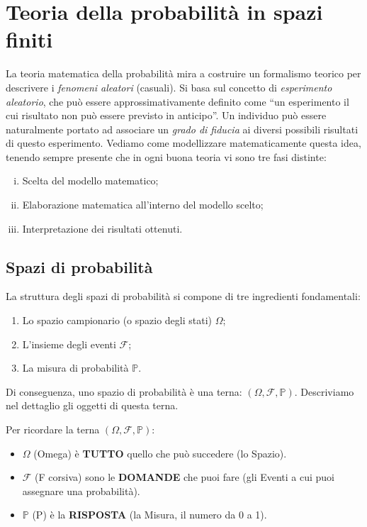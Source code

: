 \documentclass[11pt, a4paper]{report}
\theoremstyle{plain}
\theoremstyle{definition}
\theoremstyle{remark}
\newcommand{\PP}{\mathbb{P}}
\newcommand{\F}{\mathcal{F}}
\newcommand{\1}{\mathbf{1}}
\begin{document}
\newpage

\chapter{Teoria della probabilità in spazi finiti}

La teoria matematica della probabilità mira a costruire un formalismo teorico per descrivere i \emph{fenomeni aleatori} (casuali). Si basa sul concetto di \emph{esperimento aleatorio}, che può essere approssimativamente definito come ``un esperimento il cui risultato non può essere previsto in anticipo''. Un individuo può essere naturalmente portato ad associare un \emph{grado di fiducia} ai diversi possibili risultati di questo esperimento. Vediamo come modellizzare matematicamente questa idea, tenendo sempre presente che in ogni buona teoria vi sono tre fasi distinte:
\begin{enumerate}[(i)]
    \item Scelta del modello matematico;
    \item Elaborazione matematica all'interno del modello scelto;
    \item Interpretazione dei risultati ottenuti.
\end{enumerate}

\section{Spazi di probabilità}

La struttura degli spazi di probabilità si compone di tre ingredienti fondamentali:
\begin{enumerate}
    \item Lo spazio campionario (o spazio degli stati) $\Omega$;
    \item L'insieme degli eventi $\F$;
    \item La misura di probabilità $\PP$.
\end{enumerate}
Di conseguenza, uno spazio di probabilità è una terna: $(\Omega, \F, \PP)$. Descriviamo nel dettaglio gli oggetti di questa terna.

\begin{hint}
    Per ricordare la terna $(\Omega, \F, \PP)$:
    \begin{itemize}
        \item $\Omega$ (Omega) è \textbf{TUTTO} quello che può succedere (lo Spazio).
        \item $\F$ (F corsiva) sono le \textbf{DOMANDE} che puoi fare (gli Eventi a cui puoi assegnare una probabilità).
        \item $\PP$ (P) è la \textbf{RISPOSTA} (la Misura, il numero da 0 a 1).
    \end{itemize}
\end{hint}
\end{document}
